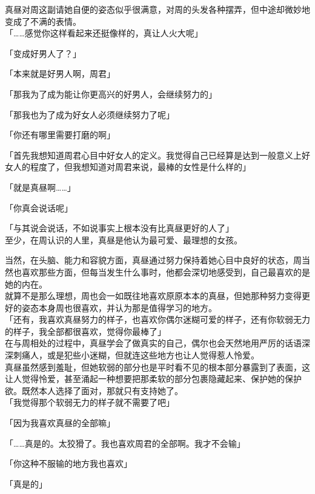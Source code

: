 真昼对周这副请她自便的姿态似乎很满意，对周的头发各种摆弄，但中途却微妙地变成了不满的表情。\\

「……感觉你这样看起来还挺像样的，真让人火大呢」

「变成好男人了？」

「本来就是好男人啊，周君」

「那我为了成为能让你更高兴的好男人，会继续努力的」

「那我也为了成为好女人必须继续努力了呢」

「你还有哪里需要打磨的啊」

「首先我想知道周君心目中好女人的定义。我觉得自己已经算是达到一般意义上好女人的程度了，但我想知道对周君来说，最棒的女性是什么样的」

「就是真昼啊……」

「你真会说话呢」

「与其说会说话，不如说事实上根本没有比真昼更好的人了」\\

至少，在周认识的人里，真昼是他认为最可爱、最理想的女孩。

当然，在头脑、能力和容貌方面，真昼通过努力保持着她心目中良好的状态，周当然也喜欢那些方面，但每当发生什么事时，他都会深切地感受到，自己最喜欢的是她的内在。\\

就算不是那么理想，周也会一如既往地喜欢原原本本的真昼，但她那种努力变得更好的姿态本身周也很喜欢，并认为那是值得学习的地方。\\

「还有，我喜欢真昼努力的样子，也喜欢你偶尔迷糊可爱的样子，还有你软弱无力的样子，我全部都很喜欢，觉得你最棒了」\\

在与周相处的过程中，真昼学会了做真实的自己，偶尔也会天然地用严厉的话语深深刺痛人，或是犯些小迷糊，但就连这些地方也让人觉得惹人怜爱。\\

真昼虽然感到羞耻，但她软弱的部分也是平时看不见的根本部分暴露到了表面，这让人觉得怜爱，甚至涌起一种想要把那柔软的部分包裹隐藏起来、保护她的保护欲。既然本人选择了面对，那就只有支持她了。\\

「我觉得那个软弱无力的样子就不需要了吧」

「因为我喜欢真昼的全部嘛」

「……真是的。太狡猾了。我也喜欢周君的全部啊。我才不会输」

「你这种不服输的地方我也喜欢」

「真是的」\\

